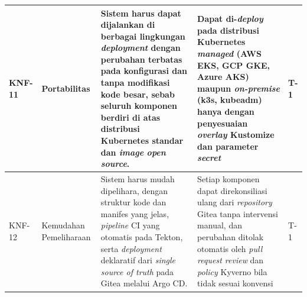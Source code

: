 {\begin{longtable}{|>{\centering\arraybackslash}m{1cm}|m{2.5cm}|m{5.1cm}|m{3cm}|>{\centering\arraybackslash}m{1.2cm}|}
\hline
KNF-11 & Portabilitas & Sistem harus dapat dijalankan di berbagai lingkungan \textit{deployment} dengan perubahan terbatas pada konfigurasi dan tanpa modifikasi kode besar, sebab seluruh komponen berdiri di atas distribusi Kubernetes standar dan \textit{image} \textit{open source}. & Dapat di-\textit{deploy} pada distribusi Kubernetes \textit{managed} (AWS EKS, GCP GKE, Azure AKS) maupun \textit{on-premise} (k3s, kubeadm) hanya dengan penyesuaian \textit{overlay} Kustomize dan parameter \textit{secret} & T-1 \\
\hline
KNF-12 & Kemudahan Pemeliharaan & Sistem harus mudah dipelihara, dengan struktur kode dan manifes yang jelas, \textit{pipeline} CI yang otomatis pada Tekton, serta \textit{deployment} deklaratif dari \textit{single source of truth} pada Gitea melalui Argo CD. & Setiap komponen dapat direkonsiliasi ulang dari \textit{repository} Gitea tanpa intervensi manual, dan perubahan ditolak otomatis oleh \textit{pull request review} dan \textit{policy} Kyverno bila tidak sesuai konvensi & T-1 \\
\hline
\end{longtable}
}